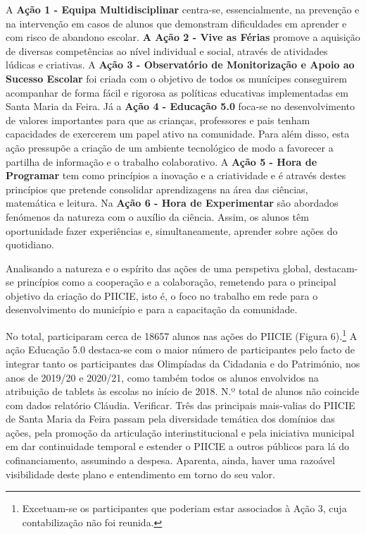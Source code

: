 \documentclass[
]{book}
\begin{document}
A \textbf{Ação 1 - Equipa Multidisciplinar} centra-se, essencialmente, na prevenção e na intervenção em casos de alunos que demonstram dificuldades em aprender e com risco de abandono escolar. \textbf{A Ação 2 - Vive as Férias} promove a aquisição de diversas competências ao nível individual e social, através de atividades lúdicas e criativas. A \textbf{Ação 3 - Observatório de Monitorização e Apoio ao Sucesso Escolar} foi criada com o objetivo de todos os munícipes conseguirem acompanhar de forma fácil e rigorosa as políticas educativas implementadas em Santa Maria da Feira. Já a \textbf{Ação 4 - Educação 5.0} foca-se no desenvolvimento de valores importantes para que as crianças, professores e pais tenham capacidades de exercerem um papel ativo na comunidade. Para além disso, esta ação pressupõe a criação de um ambiente tecnológico de modo a favorecer a partilha de informação e o trabalho colaborativo. A \textbf{Ação 5 - Hora de Programar} tem como princípios a inovação e a criatividade e é através destes princípios que pretende consolidar aprendizagens na área das ciências, matemática e leitura. Na \textbf{Ação 6 - Hora de Experimentar} são abordados fenómenos da natureza com o auxílio da ciência. Assim, os alunos têm oportunidade fazer experiências e, simultaneamente, aprender sobre ações do quotidiano.

Analisando a natureza e o espírito das ações de uma perspetiva global, destacam-se princípios como a cooperação e a colaboração, remetendo para o principal objetivo da criação do PIICIE, isto é, o foco no trabalho em rede para o desenvolvimento do município e para a capacitação da comunidade.

No total, participaram cerca de 18657 alunos nas ações do PIICIE (Figura 6).\footnote{Excetuam-se os participantes que poderiam estar associados à Ação 3, cuja contabilização não foi reunida.} A ação Educação 5.0 destaca-se com o maior número de participantes pelo facto de integrar tanto os participantes das Olimpíadas da Cidadania e do Património, nos anos de 2019/20 e 2020/21, como também todos os alunos envolvidos na atribuição de tablets às escolas no início de 2018. N.º total de alunos não coincide com dados relatório Cláudia. Verificar.
Três das principais mais-valias do PIICIE de Santa Maria da Feira passam pela diversidade temática dos domínios das ações, pela promoção da articulação interinstitucional e pela iniciativa municipal em dar continuidade temporal e estender o PIICIE a outros públicos para lá do cofinanciamento, assumindo a despesa. Aparenta, ainda, haver uma razoável visibilidade deste plano e entendimento em torno do seu valor.
\end{document}
